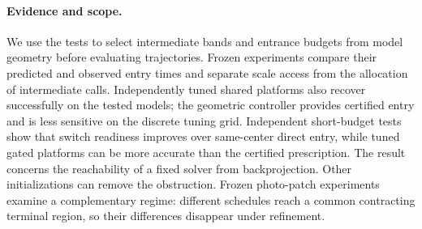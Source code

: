 \paragraph{Evidence and scope.}
We use the tests to select intermediate bands and entrance budgets
from model geometry before evaluating trajectories. Frozen
experiments compare their predicted and observed entry times and
separate scale access from the allocation of intermediate calls.
Independently tuned shared platforms also recover successfully on
the tested models; the geometric controller provides certified
entry and is less sensitive on the discrete tuning grid.
Independent short-budget tests show that switch readiness improves
over same-center direct entry, while tuned gated platforms can be
more accurate than the certified prescription.
The result concerns the reachability of a fixed solver from
backprojection. Other initializations can remove the obstruction.
Frozen photo-patch experiments examine a complementary regime:
different schedules reach a common contracting terminal region,
so their differences disappear under refinement.

